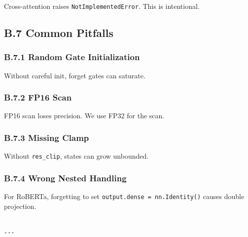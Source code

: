 Cross-attention raises \texttt{NotImplementedError}. This is intentional.

\subsection{B.7 Common Pitfalls}

\subsubsection{B.7.1 Random Gate Initialization}

Without careful init, forget gates can saturate.

\subsubsection{B.7.2 FP16 Scan}

FP16 scan loses precision. We use FP32 for the scan.

\subsubsection{B.7.3 Missing Clamp}

Without \texttt{res\_clip}, states can grow unbounded.

\subsubsection{B.7.4 Wrong Nested Handling}

For RoBERTa, forgetting to set \texttt{output.dense = nn.Identity()} causes 
double projection.
\begin{lstlisting}

---
\end{lstlisting}